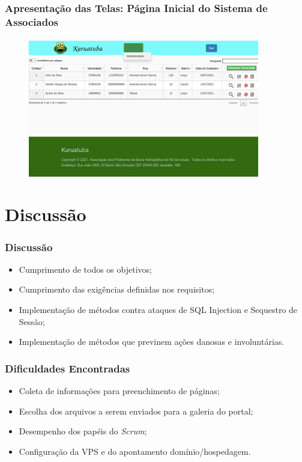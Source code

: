 \documentclass[xcolor=table]{beamer}
\begin{document}
\begin{frame}
    \frametitle{Apresentação das Telas: Página Inicial do Sistema de Associados}
    \begin{figure}[htb]
        \centering
        \includegraphics[width=0.9\textwidth]{../figuras/kuruatuba_sistema_home.png}
        \label{fig:home-sistema}
    \end{figure}
\end{frame}



\section{Discussão}
\begin{frame}
    \frametitle{Discussão}
    \begin{itemize}
        \item Cumprimento de todos os objetivos;
        \item Cumprimento das exigências definidas nos requisitos;
        \item Implementação de métodos contra ataques de SQL Injection e Sequestro de Sessão; %
        \item Implementação de métodos que previnem ações danosas e involuntárias. %
    \end{itemize}
\end{frame}


\begin{frame}
    \frametitle{Dificuldades Encontradas}
    \begin{itemize}
     \item Coleta de informações para preenchimento de páginas;
     \item Escolha dos arquivos a serem enviados para a galeria do portal;
     \item Desempenho dos papéis do \textit{Scrum}; %
     \item Configuração da VPS e do apontamento domínio/hospedagem.
    \end{itemize}

\end{frame}
\end{document}
